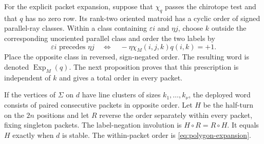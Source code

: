 For the explicit packet expansion, suppose that $\chi_q$ passes the
chirotope test and that $q$ has no zero row. Its rank-two oriented
matroid has a cyclic order of signed parallel-ray classes. Within a
class containing $\varepsilon i$ and $\eta j$, choose $k$ outside
the corresponding unoriented parallel class and order the two labels by
\begin{equation}\label{eq:polygon-expansion}
 \varepsilon i\text{ precedes }\eta j
 \quad\Longleftrightarrow\quad
 -\eta\chi_M(i,j,k)q(i,k)=+1.
\end{equation}
Place the opposite class in reversed, sign-negated order.
The resulting word is denoted $\operatorname{Exp}_M(q)$.
The next proposition proves that this prescription is independent of
$k$ and gives a total order in every packet.

\begin{proposition}\label{prop:packet-order}

If the vertices of $\Sigma$ on $d$ have line clusters of sizes
$k_1,\ldots,k_\nu$, the deployed word consists of paired consecutive
packets in opposite order.  Let $H$ be the half-turn on the $2n$
positions and let $R$ reverse the order separately within every
packet, fixing singleton packets.  The label-negation involution is
$H\circ R=R\circ H$.  It equals $H$ exactly when $d$ is stable.
The within-packet order is \eqref{eq:polygon-expansion}.
\end{proposition}
